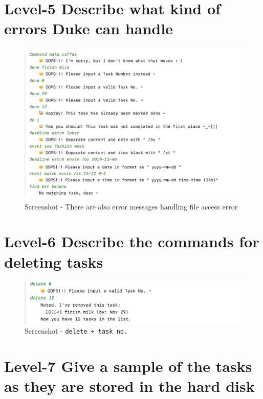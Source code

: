 \documentclass[a4paper,11pt, twoside]{article}
\begin{document}
\begin{table} [htbp]
\section* {Level-5 Describe what kind of errors Duke can handle} 
\begin{figure}[h]
\left
\includegraphics[width = 16cm]{error.png}
\caption{Screenshot - There are also error messages handling file access error} 
\end{figure} 


\section* {Level-6 Describe the commands for deleting tasks} 

\begin{figure}[H]
\left
\includegraphics[width = 15.4cm]{delete.png}
\caption{Screenshot - \texttt{delete + task no.}} 
\end{figure} 


\section* {Level-7 Give a sample of the tasks as they are stored in the hard disk} 


\end{table}
\end{document}
